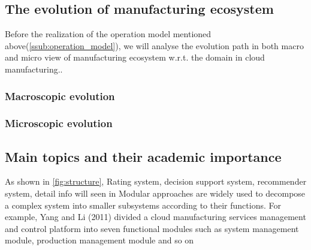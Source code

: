 

\subsection{The evolution of manufacturing ecosystem} %
\label{sub:the_evolution_of_manufacturing_ecosystem}
Before the realization of the operation model mentioned above(\autoref{ssub:operation_model}), we will analyse the evolution path in both macro and micro view of manufacturing ecosystem w.r.t. the domain in cloud manufacturing..  
\subsubsection{Macroscopic evolution} %
\label{ssub:macroscopic_evolution}

\subsubsection{Microscopic evolution} %
\label{ssub:microscopic_evolution}


\subsection{Main topics and their academic importance}
As shown in \autoref{fig:structure}, 
Rating system, decision support system, recommender system,
detail info will seen in
Modular approaches are widely used to decompose a complex system into smaller subsystems according to their functions. For example, Yang and Li (2011) divided a cloud manufacturing services management and control platform into seven functional modules such as system management module, production management module and so on

